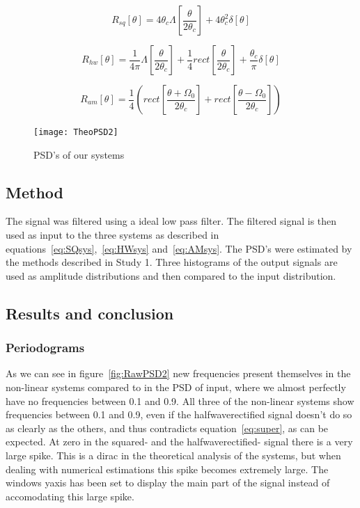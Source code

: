\documentclass[10pt]{article}
\begin{document}
\begin{equation}
  \label{eq:PSDsq}
  R_{sq}[\theta] = 4\theta_c\Lambda[\frac{\theta}{2\theta_c}]+4\theta_c^2\delta[\theta]
\end{equation}

\begin{equation}
  \label{eq:PSDhw}
 R_{hw}[\theta] = \frac{1}{4\pi}\Lambda[\frac{\theta}{2\theta_c}]+\frac{1}{4}rect[\frac{\theta} {2\theta_c}]
+\frac{\theta_c}{\pi}\delta[\theta]
\end{equation}

\begin{equation}
  \label{eq:PSDam}
  R_{am}[\theta] = \frac{1}{4}(rect[\frac{\theta+\Omega_{0}} {2\theta_c}]+rect[\frac{\theta-\Omega_{0}} {2\theta_c}])
\end{equation}

\begin{figure}[!hp]

    \begin{center}
      \texttt{[image: TheoPSD2]}
    \caption{PSD's of our systems \label{fig:theoPSD2}}
    \end{center}

\end{figure}

\subsection{Method}
The signal was filtered using a ideal low pass filter. The filtered signal
is then used as input to the three systems as described in
equations~\ref{eq:SQsys},~\ref{eq:HWsys} and~\ref{eq:AMsys}.
The PSD's were estimated by the methods described in Study 1.
Three histograms of the output signals are used as amplitude distributions
and then compared to the input distribution.

\subsection{Results and conclusion}

\subsubsection{Periodograms}
As we can see in figure~\ref{fig:RawPSD2} new frequencies present themselves in
the non-linear systems compared to in the PSD of input, where we almost perfectly
have no frequencies between 0.1 and 0.9. All three of the non-linear systems show
frequencies between 0.1 and 0.9, even if the halfwaverectified signal doesn't do
so as clearly as the others, and thus contradicts equation~\ref{eq:super}, as can
be expected. At zero in the squared- and the halfwaverectified-
signal there is a very large spike. This is a dirac in the theoretical analysis
of the systems, but when dealing with numerical estimations this spike becomes
extremely large. The windows yaxis has been set to display the main part of the
signal instead of accomodating this large spike.
\end{document}
